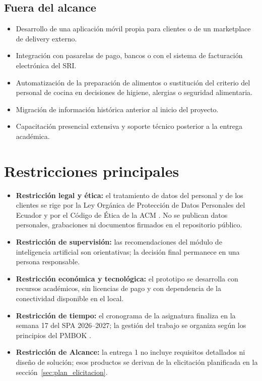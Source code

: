 \subsection{Fuera del alcance}
\begin{itemize}[leftmargin=18pt,itemsep=0pt]
    \item Desarrollo de una aplicaci\'on m\'ovil propia para clientes o de un marketplace de delivery externo.
    \item Integraci\'on con pasarelas de pago, bancos o con el sistema de facturaci\'on electr\'onica del SRI.
    \item Automatizaci\'on de la preparaci\'on de alimentos o sustituci\'on del criterio del personal de cocina en decisiones de higiene, alergias o seguridad alimentaria.
    \item Migraci\'on de informaci\'on hist\'orica anterior al inicio del proyecto.
    \item Capacitaci\'on presencial extensiva y soporte t\'ecnico posterior a la entrega acad\'emica.
\end{itemize}

\section{Restricciones principales}
\begin{itemize}[leftmargin=18pt,itemsep=0pt]
    \item \textbf{Restricci\'on legal y \'etica:} el tratamiento de datos del personal y de los clientes se rige por la Ley Org\'anica de Protecci\'on de Datos Personales del Ecuador \cite{lopdp2021} y por el C\'odigo de \'Etica de la ACM \cite{acm2018}. No se publican datos personales, grabaciones ni documentos firmados en el repositorio p\'ublico.
    \item \textbf{Restricci\'on de supervisi\'on:} las recomendaciones del m\'odulo de inteligencia artificial son orientativas; la decisi\'on final permanece en una persona responsable.
    \item \textbf{Restricci\'on econ\'omica y tecnol\'ogica:} el prototipo se desarrolla con recursos acad\'emicos, sin licencias de pago y con dependencia de la conectividad disponible en el local.
    \item \textbf{Restricci\'on de tiempo:} el cronograma de la asignatura finaliza en la semana 17 del SPA 2026--2027; la gesti\'on del trabajo se organiza seg\'un los principios del PMBOK \cite{pmbok2021}.
    \item \textbf{Restricci\'on de Alcance:} la entrega 1 no incluye requisitos detallados ni dise\~no de soluci\'on; esos productos se derivan de la elicitaci\'on planificada en la secci\'on~\ref{sec:plan_elicitacion}.
\end{itemize}

